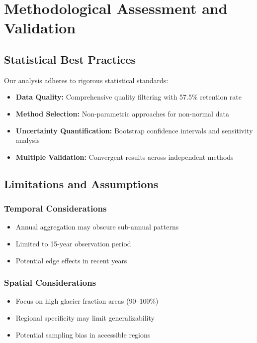 \documentclass[12pt,a4paper]{article}
\begin{document}
\section{Methodological Assessment and Validation}

\subsection{Statistical Best Practices}

Our analysis adheres to rigorous statistical standards:

\begin{itemize}
    \item \textbf{Data Quality:} Comprehensive quality filtering with 57.5\% retention rate
    \item \textbf{Method Selection:} Non-parametric approaches for non-normal data
    \item \textbf{Uncertainty Quantification:} Bootstrap confidence intervals and sensitivity analysis
    \item \textbf{Multiple Validation:} Convergent results across independent methods
\end{itemize}

\subsection{Limitations and Assumptions}

\subsubsection{Temporal Considerations}
\begin{itemize}
    \item Annual aggregation may obscure sub-annual patterns
    \item Limited to 15-year observation period
    \item Potential edge effects in recent years
\end{itemize}

\subsubsection{Spatial Considerations}
\begin{itemize}
    \item Focus on high glacier fraction areas (90--100\%)
    \item Regional specificity may limit generalizability
    \item Potential sampling bias in accessible regions
\end{itemize}
\end{document}
